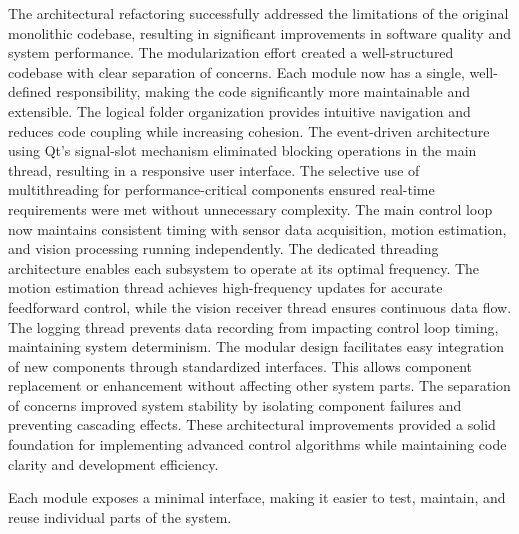 The architectural refactoring successfully addressed the limitations of the original monolithic codebase, resulting in significant improvements in software quality and system performance.
The modularization effort created a well-structured codebase with clear separation of concerns. Each module now has a single, well-defined responsibility, making the code significantly more maintainable and extensible. The logical folder organization provides intuitive navigation and reduces code coupling while increasing cohesion.
The event-driven architecture using Qt's signal-slot mechanism eliminated blocking operations in the main thread, resulting in a responsive user interface. The selective use of multithreading for performance-critical components ensured real-time requirements were met without unnecessary complexity. The main control loop now maintains consistent timing with sensor data acquisition, motion estimation, and vision processing running independently.
The dedicated threading architecture enables each subsystem to operate at its optimal frequency. The motion estimation thread achieves high-frequency updates for accurate feedforward control, while the vision receiver thread ensures continuous data flow. The logging thread prevents data recording from impacting control loop timing, maintaining system determinism.
The modular design facilitates easy integration of new components through standardized interfaces. This allows component replacement or enhancement without affecting other system parts. The separation of concerns improved system stability by isolating component failures and preventing cascading effects. These architectural improvements provided a solid foundation for implementing advanced control algorithms while maintaining code clarity and development efficiency.

Each module exposes a minimal interface, making it easier to test, maintain, and reuse individual parts of the system.



